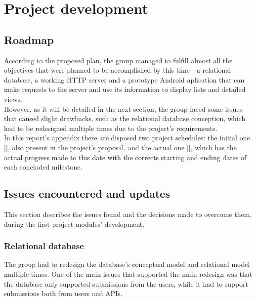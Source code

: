 %
%
\chapter{Project development}
    
	\section{Roadmap}

    According to the proposed plan, the group managed to fulfill almost all the objectives
    that were planned to be accomplished by this time - a relational database, a working HTTP server
    and a prototype Android aplication that can make requests to the server and 
    use its information to display lists and detailed views.\\

    However, as it will be detailed in the next section, the group faced some issues that caused slight
    drawbacks, such as the relational database conception, which had to be redesigned multiple
    times due to the project's requirements.\\

    In this report's appendix there are disposed two project schedules: the initial one [], also present in the
    project's proposal, and the actual one [], which has the actual progress made to this date with the corrects starting
    and ending dates of each concluded milestone.


    \section{Issues encountered and updates}

    This section describes the issues found and the decisions made
    to overcome them, during the first project modules' development.
    
    \subsection{Relational database}

    The group had to redesign the database's conceptual model and relational model multiple times.
    One of the main issues that supported the main redesign was that the database 
    only supported submissions from the users, while it had to support submissions both from users and APIs.\\

